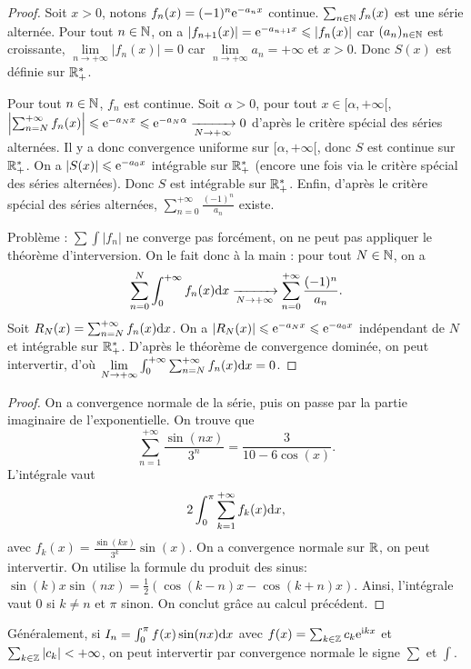 \documentclass[12pt]{article}
\begin{document}
\begin{proof}
    Soit $x>0$, notons $f_n(x)=(-1)^{n}\mathrm{e}^{-a_n x}$ continue. $\sum_{n\in\mathbb{N}}f_n(x)$ est une série alternée. Pour tout $n\in\mathbb{N}$, on a $\left\lvert f_{n+1}(x)\right\rvert=\mathrm{e}^{-a_{n+1} x}\leqslant\left\lvert f_n(x)\right\rvert$ car $(a_n)_{n\in\mathbb{N}}$ est croissante, $\lim\limits_{n\to+\infty}\left\lvert f_n(x)\right\rvert=0$ car $\lim\limits_{n\to+\infty}a_n=+\infty$ et $x>0$. Donc $S(x)$ est définie sur $\mathbb{R}_{+}^{*}$.

    Pour tout $n\in\mathbb{N}$, $f_n$ est continue. Soit $\alpha>0$, pour tout $x\in[\alpha,+\infty[$, $\left\lvert\sum_{n=N}^{+\infty}f_n(x)\right\rvert\leqslant\mathrm{e}^{-a_{N}x}\leqslant\mathrm{e}^{-a_N \alpha}\xrightarrow[N\to+\infty]{}0$ d'après le critère spécial des séries alternées. Il y a donc convergence uniforme sur $[\alpha,+\infty[$, donc $S$ est continue sur $\mathbb{R}_{+}^{*}$. On a $\left\lvert S(x)\right\rvert\leqslant\mathrm{e}^{-a_0 x}$ intégrable sur $\mathbb{R}_{+}^{*}$ (encore une fois via le critère spécial des séries alternées). Donc $S$ est intégrable sur $\mathbb{R}_{+}^{*}$. Enfin, d'après le critère spécial des séries alternées, $\sum_{n=0}^{+\infty}\frac{(-1)^{n}}{a_n}$ existe.

    Problème : $\sum\int\left\lvert f_n\right\rvert$ ne converge pas forcément, on ne peut pas appliquer le théorème d'interversion.
    On le fait donc à la main : pour tout $N\in\mathbb{N}$, on a 
    \begin{equation}
        \sum_{n=0}^{N}\int_{0}^{+\infty}f_n(x)\mathrm{d} x\xrightarrow[N\to+\infty]{}\sum_{n=0}^{+\infty}\frac{(-1)^{n}}{a_n}.
    \end{equation}
    Soit $R_N(x)=\sum_{n=N}^{+\infty}f_n(x)\mathrm{d} x$. On a $\left\lvert R_N(x)\right\rvert\leqslant\mathrm{e}^{-a_N x}\leqslant \mathrm{e}^{-a_0 x}$ indépendant de $N$ et intégrable sur $\mathbb{R}_{+}^{*}$. D'après le théorème de convergence dominée, on peut intervertir, d'où $\lim\limits_{N\to+\infty}\int_{0}^{+\infty}\sum_{n=N}^{+\infty}f_n(x)\mathrm{d} x=0$.
\end{proof}

\begin{proof}
    On a convergence normale de la série, puis on passe par la partie imaginaire de l'exponentielle. On trouve que 
    \begin{equation*}
        \sum_{n=1}^{+\infty}\frac{\sin(nx)}{3^{n}}=\frac{3}{10-6\cos(x)}.
    \end{equation*}
    L'intégrale vaut
    \begin{equation*}
        2\int_{0}^{\pi}\sum_{k=1}^{+\infty}f_k(x)\mathrm{d} x,
    \end{equation*}
    avec $f_k(x)=\frac{\sin(kx)}{3^{k}}\sin(x)$. On a convergence normale sur $\mathbb{R}$, on peut intervertir. On utilise la formule du produit des sinus: $\sin(k)x\sin(nx)=\frac{1}{2}\left(\cos(k-n)x-\cos(k+n)x\right)$. Ainsi, l'intégrale vaut 0 si $k\neq n$ et $\pi$ sinon. On conclut grâce au calcul précédent.
\end{proof}

\begin{remark}
    Généralement, si $I_n=\int_{0}^{\pi}f(x)\sin(nx)\mathrm{d} x$ avec $f(x)=\sum_{k\in\mathbb{Z}}c_k\mathrm{e}^{\mathrm{i} kx}$ et $\sum_{k\in\mathbb{Z}}\left\lvert c_k\right\rvert<+\infty$, on peut intervertir par convergence normale le signe $\sum$ et $\int$.
\end{remark}
\end{document}
